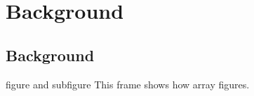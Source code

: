 \documentclass[notes,11pt, aspectratio=169]{beamer}
\begin{document}



\section{Background}

\subsection*{Background}


\begin{frame}{figure and subfigure}
This frame shows how array figures.
\end{frame}
\end{document}
